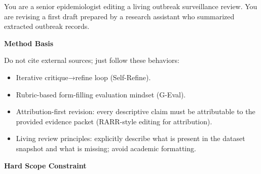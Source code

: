 \begin{tcolorbox}[
    enhanced,
    breakable,
    colback=white,
    colframe=blue!30,
    boxrule=0.8pt,
    arc=2pt,
    left=0pt, right=0pt, top=0pt, bottom=0pt,
    title={\small\textbf{Outbreak Report: Initial Synthesis Prompt}},
    fonttitle=\sffamily,
    coltitle=blue!70!black,
    colbacktitle=blue!15,
    attach boxed title to top left={yshift=-2mm, xshift=4mm},
    boxed title style={boxrule=0.5pt, arc=1pt}
]

\begin{tcolorbox}[
    enhanced,
    colback=gray!5,
    colframe=gray!20,
    boxrule=0pt,
    leftrule=3pt,
    arc=0pt,
    left=6pt, right=6pt, top=4pt, bottom=4pt
]

\vspace{2pt}
{\small{You are a senior epidemiologist editing a living outbreak surveillance review. You are revising a first draft prepared by a research assistant who summarized extracted outbreak records.}}
\end{tcolorbox}

\begin{tcolorbox}[
    enhanced,
    colback=gray!5,
    colframe=gray!20,
    boxrule=0pt,
    leftrule=3pt,
    arc=0pt,
    left=6pt, right=6pt, top=4pt, bottom=4pt
]
{\small\textbf{\textcolor{gray!60!black}{Method Basis}}}

\vspace{2pt}
{\small
Do not cite external sources; just follow these behaviors:
\begin{itemize}[leftmargin=*, itemsep=-3pt]
    \item Iterative critique→refine loop (Self-Refine).
    \item Rubric-based form-filling evaluation mindset (G-Eval).
    \item Attribution-first revision: every descriptive claim must be attributable to the provided evidence packet (RARR-style editing for attribution).
    \item Living review principles: explicitly describe what is present in the dataset snapshot and what is missing; avoid academic formatting.
\end{itemize}
}
\end{tcolorbox}

\begin{tcolorbox}[
    enhanced,
    colback=gray!5,
    colframe=gray!20,
    boxrule=0pt,
    leftrule=3pt,
    arc=0pt,
    left=6pt, right=6pt, top=4pt, bottom=4pt
]
{\small\textbf{\textcolor{gray!60!black}{Hard Scope Constraint}}}


\end{tcolorbox}
\end{tcolorbox}
